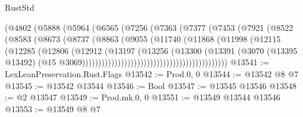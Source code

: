 \begin{lexlean}{RustStd}
\begin{coremodule}
                                      (@4802
                                        (@5888
                                          (@5964
                                            (@6565
                                              (@7256
                                                (@7363
                                                  (@7377
                                                    (@7453
                                                      (@7921
                                                        (@8522
                                                          (@8583
                                                            (@8673
                                                              (@8737
                                                                (@8863
                                                                  (@9055
                                                                    (@11740
                                                                      (@11868
                                                                        (@11998
                                                                          (@12115
                                                                            (@12285
                                                                              (@12806
                                                                                (@12912
                                                                                  (@13197
                                                                                    (@13256
                                                                                      (@13300
                                                                                        (@13391
                                                                                          (@3070
                                                                                            (@13395
                                                                                              @13492)
                                                                                            (@15
                                                                                              @3069)))))))))))))))))))))))))))))))))))))))))))))
@13541 := LexLeanPreservation.Rust.Flags
@13542 := Prod.{0, 0}
@13544 := @13542 @8 @7
@13545 := @13542 @13544
@13546 := Bool
@13547 := @13545 @13546
@13548 := @2 @13547
@13549 := Prod.mk.{0, 0}
@13551 := @13549 @13544 @13546
@13553 := @13549 @8 @7

\end{coremodule}
\end{lexlean}
